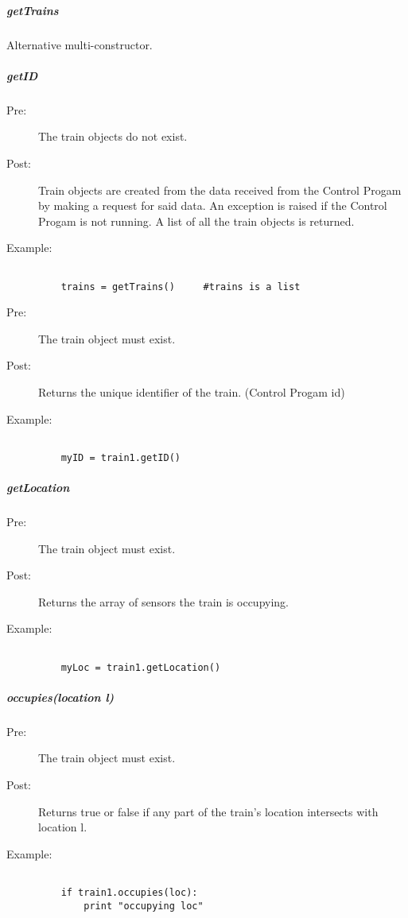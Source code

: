 \documentclass[a4paper,11pt,notitlepage]{article}
\def\CS{Control Progam\xspace}
\begin{document}
\subparagraph{getTrains} Alternative multi-constructor. 
\subparagraph{getID}
\begin{description}
\item[\hspace{1cm}Pre:] The train objects do not exist. 
\item[\hspace{1cm}Post:] Train objects are created from the data received from the \CS by making a request for said data. An exception is raised if the \CS is not running. A list of all the train objects is returned.
\item[\hspace{1cm}Example:]
\begin{verbatim}

    trains = getTrains()     #trains is a list
\end{verbatim}
\end{description}

\begin{description}
\item[\hspace{1cm}Pre:] The train object must exist. 
\item[\hspace{1cm}Post:] Returns the unique identifier of the train. (\CS id)
\item[\hspace{1cm}Example:]
\begin{verbatim}

    myID = train1.getID()
\end{verbatim}
\end{description}

\subparagraph{getLocation} 
\begin{description}
\item[\hspace{1cm}Pre:] The train object must exist. 
\item[\hspace{1cm}Post:] Returns the array of sensors the train is occupying.
\item[\hspace{1cm}Example:]
\begin{verbatim}

    myLoc = train1.getLocation()
\end{verbatim}
\end{description}


\subparagraph{occupies(location l)} 
\begin{description}
\item[\hspace{1cm}Pre:] The train object must exist. 
\item[\hspace{1cm}Post:] Returns true or false if any part of the train's location intersects with location l.
\item[\hspace{1cm}Example:]
\begin{verbatim}

    if train1.occupies(loc):
        print "occupying loc"
\end{verbatim}
\end{description}
\end{document}
